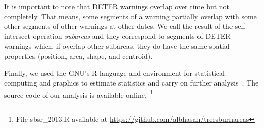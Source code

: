 It is important to note that DETER warnings overlap over time but not
completely. That means, some segments of a warning partially overlap with 
some other segments of other warnings at other dates.
We call the result of the self-intersect operation \textit{subareas} and they 
correspond to segments of DETER warnings which, if overlap other subareas, 
they do have the same spatial properties (position, area, shape, and centroid).

Finally, we used the GNU's R language and environment for statistical 
computing and graphics to estimate statistics and carry on further 
analysis~\cite{r_manual}. 
The source code of our analysis is available 
online.~\footnote{File sbsr\_2013.R available at
\url{https://github.com/albhasan/treesburnareas}}


